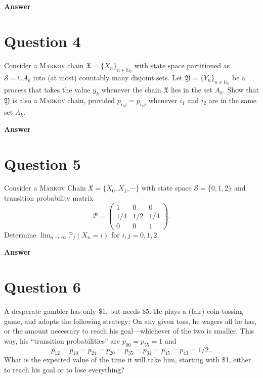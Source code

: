 \documentclass[letterpaper]{article}
\begin{document}
		
		\textbf{Answer}
		
		\clearpage
		
		\section{Question 4}
		
		Consider a \textsc{Markov} chain $\mathfrak{X} = \{X_n\}_{n \in \mathbb{N}_0}$ with state space partitioned as $\mathcal{S} = \cup A_k$ into (at most) countably many disjoint sets. Let $\mathfrak{Y} = \{Y_n\}_{n \in \mathbb{N}_0}$ be a process that takes the value $y_k$ whenever the chain $\mathfrak{X}$ lies in the set $A_k$. Show that $\mathfrak{Y}$ is also a \textsc{Markov} chain, provided $p_{i_1 j} = p_{i_2 j}$ whenever $i_1$ and $i_2$ are in the same set $A_k$.
		
		\textbf{Answer}
		
		\clearpage
		
		\section{Question 5}
		Consider a \textsc{Markov} Chain $\mathfrak{X} = \{X_0, X_1, \cdots\}$ with state space $\mathcal{S} = \{0, 1, 2\}$ and transition probability matrix
		\[
		\mathcal{P} = \begin{pmatrix} 1 & 0 & 0 \\ 1/4 & 1/2 & 1/4 \\ 0 & 0 & 1 \end{pmatrix}.
		\]
		Determine $\lim_{n \to \infty} \mathbb{P}_j(X_n = i)$ for $i, j = 0, 1, 2$.
		
		
		\textbf{Answer}
		
		\clearpage
		
		\section{Question 6}
		
		A desperate gambler has only \$1, but needs \$5. He plays a (fair) coin-tossing game, and adopts the following strategy: On any given toss, he wagers all he has, or the amount necessary to reach his goal---whichever of the two is smaller. This way, his ``transition probabilities'' are $p_{00} = p_{55} = 1$ and
		\[
		p_{12} = p_{10} = p_{24} = p_{20} = p_{35} = p_{31} = p_{45} = p_{43} = 1/2\,.
		\]
		What is the expected value of the time it will take him, starting with \$1, either to reach his goal or to lose everything?
		
\end{document}
